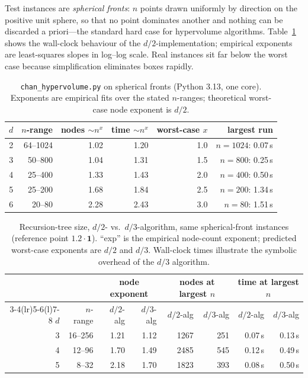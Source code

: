 \documentclass[11pt,a4paper]{article}
\theoremstyle{remark}
\begin{document}
Test instances are \emph{spherical fronts}: $n$ points drawn uniformly by
direction on the positive unit sphere, so that no point dominates another and
nothing can be discarded a priori---the standard hard case for hypervolume
algorithms.  Table~\ref{tab:section2} shows the wall-clock behaviour of the
$d/2$-implementation; empirical exponents are least-squares slopes in
log--log scale.  Real instances sit far below the worst case because
simplification eliminates boxes rapidly.

\begin{table}[ht]
\centering
\caption{\texttt{chan\_hypervolume.py} on spherical fronts (Python 3.13,
one core).  Exponents are empirical fits over the stated $n$-ranges;
theoretical worst-case node exponent is $d/2$.}
\label{tab:section2}
\begin{tabular}{@{}rrrrrr@{}}
\toprule
$d$ & $n$-range & nodes $\sim n^{x}$ & time $\sim n^{x}$ & worst-case $x$ & largest run \\
\midrule
2 & 64--1024 & 1.02 & 1.20 & 1.0 & $n{=}1024$: 0.07\,s\\
3 & 50--800  & 1.04 & 1.31 & 1.5 & $n{=}800$: 0.25\,s\\
4 & 25--400  & 1.33 & 1.43 & 2.0 & $n{=}400$: 0.50\,s\\
5 & 25--200  & 1.68 & 1.84 & 2.5 & $n{=}200$: 1.34\,s\\
6 & 20--80   & 2.28 & 2.43 & 3.0 & $n{=}80$: 1.51\,s\\
\bottomrule
\end{tabular}
\end{table}

\begin{table}[ht]
\centering
\caption{Recursion-tree size, $d/2$- vs.\ $d/3$-algorithm, same spherical-front
instances (reference point $1.2\cdot\mathbf 1$).  ``exp'' is the empirical
node-count exponent; predicted worst-case exponents are $d/2$ and $d/3$.
Wall-clock times illustrate the symbolic overhead of the $d/3$ algorithm.}
\label{tab:compare}
\begin{tabular}{@{}rrrrrrrr@{}}
\toprule
& & \multicolumn{2}{c}{node exponent} & \multicolumn{2}{c}{nodes at largest $n$} & \multicolumn{2}{c}{time at largest $n$}\\
\cmidrule(lr){3-4}\cmidrule(lr){5-6}\cmidrule(l){7-8}
$d$ & $n$-range & $d/2$-alg & $d/3$-alg & $d/2$-alg & $d/3$-alg & $d/2$-alg & $d/3$-alg\\
\midrule
3 & 16--256 & 1.21 & 1.12 & 1267 & 251 & 0.07\,s & 0.13\,s\\
4 & 12--96  & 1.70 & 1.49 & 2485 & 545 & 0.12\,s & 0.49\,s\\
5 & 8--32   & 2.18 & 1.70 & 1823 & 393 & 0.08\,s & 0.50\,s\\
\bottomrule
\end{tabular}
\end{table}
\end{document}
